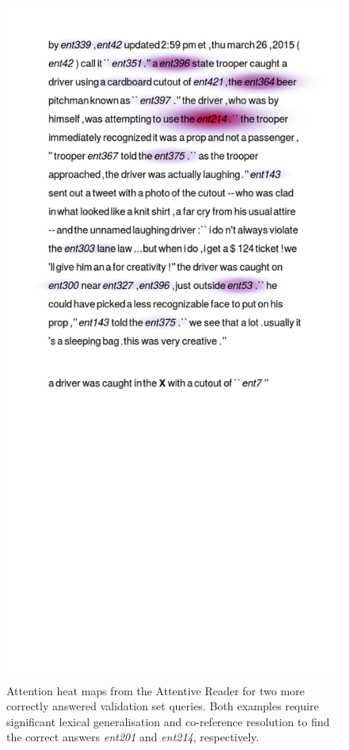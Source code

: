 \begin{figure}[h]
  \includegraphics[scale=0.30,clip=true,trim=2cm 17cm 2cm 2cm]{figs/goodexamples/113.png}
  \caption{
	   Attention heat maps from the Attentive Reader for two more
           correctly answered validation set queries. Both examples
           require significant lexical generalisation and co-reference
           resolution to find the correct answers \textit{ent201} and
           \textit{ent214}, respectively.
       }
  \label{fig:heatmapsA}
\end{figure}

